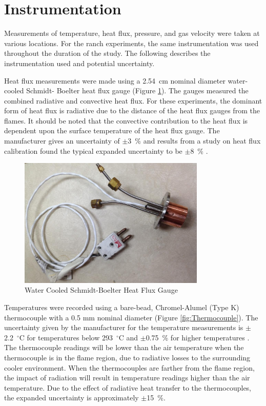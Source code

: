 \documentclass[12pt,oneside]{book}
\begin{document}
\section{Instrumentation}

Measurements of temperature, heat flux, pressure, and gas velocity were taken at various locations. For the ranch experiments, the same instrumentation was used throughout the duration of the study. The following describes the instrumentation used and potential uncertainty.

Heat flux measurements were made using a 2.54~cm nominal diameter water-cooled Schmidt- Boelter heat flux gauge (Figure \ref{fig:HeatFluxGauge}). The gauges measured the combined radiative and convective heat flux. For these experiments, the dominant form of heat flux is radiative due to the distance of the heat flux gauges from the flames. It should be noted that the convective contribution to the heat flux is dependent upon the surface temperature of the heat flux gauge. The manufacturer gives an uncertainty of $\pm$3~\% and results from a study on heat flux calibration found the typical expanded uncertainty to be $\pm$8~\% \cite{HeatFluxRoundRobin}.

\begin{figure} [H]
	\centering
	\includegraphics[width = 3.5in]{0_Images/Instrumentation/Heat_Flux_Gauge.jpg}
	\caption{Water Cooled Schmidt-Boelter Heat Flux Gauge}
	\label{fig:HeatFluxGauge}
\end{figure}

Temperatures were recorded using a bare-bead, Chromel-Alumel (Type K) thermocouple with a 0.5 mm nominal diameter (Figure \ref{fig:Thermocouple}). The uncertainty given by the manufacturer for the temperature measurements is $\pm$2.2~$^\circ$C for temperatures below 293~$^\circ$C and $\pm$0.75~\% for higher temperatures \cite{TemperatureHandbook}. The thermocouple readings will be lower than the air temperature when the thermocouple is in the flame region, due to radiative losses to the surrounding cooler environment. When the thermocouples are farther from the flame region, the impact of radiation will result in temperature readings higher than the air temperature. Due to the effect of radiative heat transfer to the thermocouples, the expanded uncertainty is approximately $\pm$15~\%.
\end{document}
